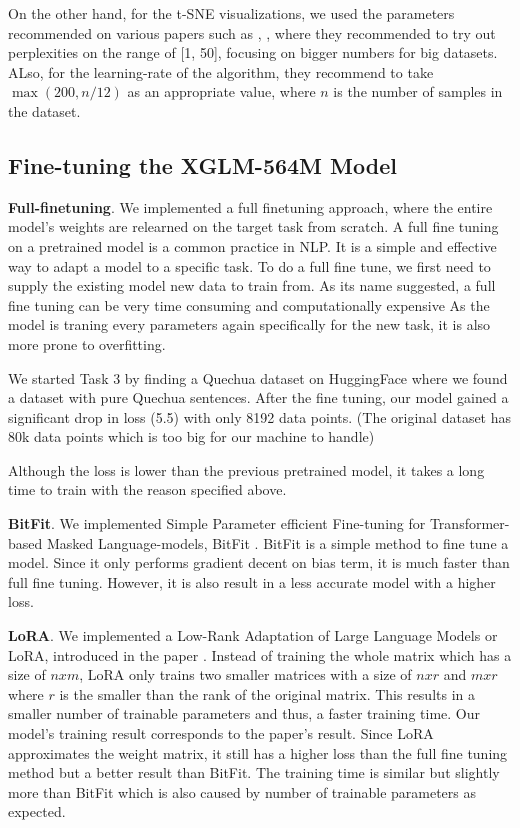 \documentclass[11pt]{article}
\newcommand{\customsection}[1]{
  \noindent\textbf{#1}.\vspace{2mm}
}
\begin{document}
On the other hand, for the t-SNE visualizations, we used the parameters recommended on various papers such as \cite{GOVE202287}, \cite{Weber2023}, where they recommended to try out perplexities on the range of [1, 50], focusing on bigger numbers for big datasets. ALso, for the learning-rate of the algorithm, they recommend to take $\max{(200, n / 12)}$ as an appropriate value, where $n$ is the number of samples in the dataset.

\subsection{Fine-tuning the XGLM-564M Model}
\customsection{Full-finetuning} We implemented a full finetuning approach, where the entire model's weights are relearned on the target task from scratch.
A full fine tuning on a pretrained model is a common practice in NLP. It is a simple and effective way to adapt a model to a specific task.
To do a full fine tune, we first need to supply the existing model new data to train from.
As its name suggested, a full fine tuning can be very time consuming and computationally expensive
As the model is traning every parameters again specifically for the new task, it is also more prone to overfitting.

We started Task 3 by finding a Quechua dataset on HuggingFace
where we found a dataset with pure Quechua sentences.
After the fine tuning, our model gained a significant drop in loss (5.5) with only 8192 data points.
(The original dataset has 80k data points which is too big for our machine to handle)

Although the loss is lower than the previous pretrained model,
it takes a long time to train with the reason specified above.

\customsection{BitFit} We implemented Simple Parameter efficient Fine-tuning
for Transformer-based Masked Language-models, BitFit \cite{zaken2022bitfit}.
BitFit is a simple method to fine tune a model. 
Since it only performs gradient decent on bias term, it is much faster than full fine tuning.
However, it is also result in a less accurate model with a higher loss.

\customsection{LoRA} We implemented a Low-Rank Adaptation of Large Language Models or LoRA, introduced in the paper \cite{hu2021lora}.
Instead of training the whole matrix which has a size of $nxm$, LoRA only trains two smaller matrices with a size of $nxr$ and $mxr$
where $r$ is the smaller than the rank of the original matrix.
This results in a smaller number of trainable parameters and thus, a faster training time.
Our model's training result corresponds to the paper's result.
Since LoRA approximates the weight matrix, it still has a higher loss than the full fine tuning method but 
a better result than BitFit.
The training time is similar but slightly more than BitFit which is also caused by number of trainable parameters as expected.
\end{document}
